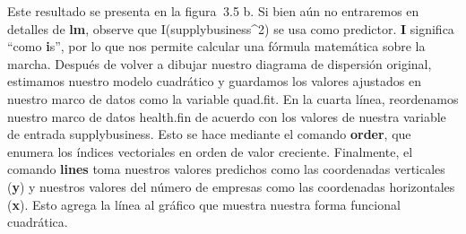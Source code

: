 \documentclass[
]{book}
\newenvironment{Shaded}{\begin{snugshade}}{\end{snugshade}}
\newcommand{\AttributeTok}[1]{\textcolor[rgb]{0.77,0.63,0.00}{#1}}
\newcommand{\DecValTok}[1]{\textcolor[rgb]{0.00,0.00,0.81}{#1}}
\newcommand{\FunctionTok}[1]{\textcolor[rgb]{0.00,0.00,0.00}{#1}}
\newcommand{\NormalTok}[1]{#1}
\newcommand{\OtherTok}[1]{\textcolor[rgb]{0.56,0.35,0.01}{#1}}
\newcommand{\SpecialCharTok}[1]{\textcolor[rgb]{0.00,0.00,0.00}{#1}}
\newcommand{\StringTok}[1]{\textcolor[rgb]{0.31,0.60,0.02}{#1}}
\begin{document}
\begin{Shaded}
\end{Shaded}

Este resultado se presenta en la figura  3.5 b. Si bien aún no entraremos en detalles de \textbf{lm}, observe que I(supplybusiness\^{}2) se usa como predictor. \textbf{I} significa ``como \textbf{i}s'', por lo que nos permite calcular una fórmula matemática sobre la marcha. Después de volver a dibujar nuestro diagrama de dispersión original, estimamos nuestro modelo cuadrático y guardamos los valores ajustados en nuestro marco de datos como la variable quad.fit. En la cuarta línea, reordenamos nuestro marco de datos health.fin de acuerdo con los valores de nuestra variable de entrada supplybusiness. Esto se hace mediante el comando \textbf{order}, que enumera los índices vectoriales en orden de valor creciente. Finalmente, el comando \textbf{lines} toma nuestros valores predichos como las coordenadas verticales (\textbf{y}) y nuestros valores del número de empresas como las coordenadas horizontales (\textbf{x}). Esto agrega la línea al gráfico que muestra nuestra forma funcional cuadrática.
\end{document}
